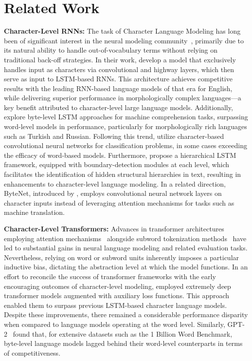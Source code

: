 \section{Related Work}
\label{section:related_work}

\textbf{Character-Level RNNs:} The task of Character Language Modeling has long been of significant interest in the neural modeling community~\citep{sutskever2011generating,mikolov2012subword,graves2013generating}, primarily due to its natural ability to handle out-of-vocabulary terms without relying on traditional back-off strategies. In their work, \cite{kim2016character} develop a model that exclusively handles input as characters via convolutional and highway layers, which then serve as input to LSTM-based RNNs. This architecture achieves competitive results with the leading RNN-based language models of that era for English, while delivering superior performance in morphologically complex languages—a key benefit attributed to character-level large language models. Additionally, \cite{kenter2018byte} explore byte-level LSTM approaches for machine comprehension tasks, surpassing word-level models in performance, particularly for morphologically rich languages such as Turkish and Russian. Following this trend, \cite{zhang2015character} utilize character-based convolutional neural networks for classification problems, in some cases exceeding the efficacy of word-based models. Furthermore, \citet{chung2019hierarchical} propose a hierarchical LSTM framework, equipped with boundary-detection modules at each level, which facilitates the identification of hidden structural hierarchies in text, resulting in enhancements to character-level language modeling. In a related direction, ByteNet, introduced by \cite{kalchbrenner2016neural}, employs convolutional neural network layers on character inputs instead of leveraging attention mechanisms for tasks such as machine translation.

\textbf{Character-Level Transformers:} Advances in transformer architectures employing attention mechanisms~\citep{vaswani2017attention} alongside subword tokenization methods~\citep{sennrich-etal-2016-neural} have led to substantial gains in neural language modeling and related evaluation tasks. Nevertheless, relying on word or subword units inherently imposes a particular inductive bias, dictating the abstraction level at which the model functions. In an effort to reconcile the success of transformer frameworks with the early encouraging outcomes of character-level modeling, \citet{al2019character} employed extremely deep transformer models augmented with auxiliary loss functions. This approach enabled them to surpass previous LSTM-based character language models. Despite these improvements, there remained a considerable performance disparity when compared to language models operating at the word level. Similarly, GPT-2~\citep{radfordgpt2} found that, for extensive datasets such as the 1 Billion Word Benchmark, byte-level language models lagged behind their word-level counterparts in terms of competitiveness.

